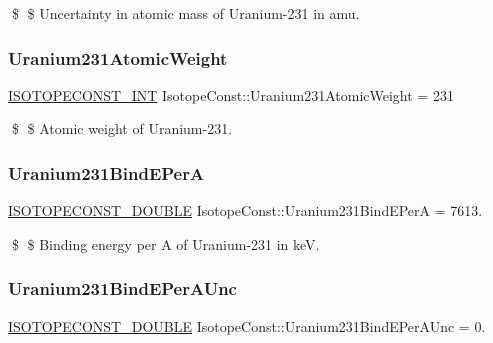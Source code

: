 \$ \$ Uncertainty in atomic mass of Uranium-\/231 in amu. \mbox{\label{group___isotope_const-_uranium-_u231_gaebe055a6631d05b739653a95ce3c3d8f}} 
\subsubsection{\texorpdfstring{Uranium231\+Atomic\+Weight}{Uranium231AtomicWeight}}
{\footnotesize\ttfamily \mbox{\hyperlink{group___isotope_const-_macros_ga5f18360b3e99483a35c32d789e62621c}{I\+S\+O\+T\+O\+P\+E\+C\+O\+N\+S\+T\+\_\+\+I\+NT}} Isotope\+Const\+::\+Uranium231\+Atomic\+Weight = 231}

\$ \$ Atomic weight of Uranium-\/231. \mbox{\label{group___isotope_const-_uranium-_u231_gaf4b05a588b770db1b7d4d0f0516332f6}} 
\subsubsection{\texorpdfstring{Uranium231\+Bind\+E\+PerA}{Uranium231BindEPerA}}
{\footnotesize\ttfamily \mbox{\hyperlink{group___isotope_const-_macros_ga8f45a7272ce02c0b4c65c44636ed719a}{I\+S\+O\+T\+O\+P\+E\+C\+O\+N\+S\+T\+\_\+\+D\+O\+U\+B\+LE}} Isotope\+Const\+::\+Uranium231\+Bind\+E\+PerA = 7613.}

\$ \$ Binding energy per A of Uranium-\/231 in keV. \mbox{\label{group___isotope_const-_uranium-_u231_ga211708959e1b3a29d37a47a0fbf055bd}} 
\subsubsection{\texorpdfstring{Uranium231\+Bind\+E\+Per\+A\+Unc}{Uranium231BindEPerAUnc}}
{\footnotesize\ttfamily \mbox{\hyperlink{group___isotope_const-_macros_ga8f45a7272ce02c0b4c65c44636ed719a}{I\+S\+O\+T\+O\+P\+E\+C\+O\+N\+S\+T\+\_\+\+D\+O\+U\+B\+LE}} Isotope\+Const\+::\+Uranium231\+Bind\+E\+Per\+A\+Unc = 0.}

